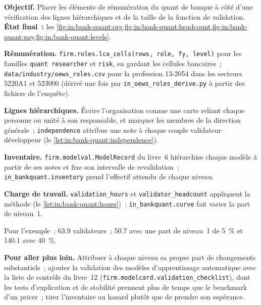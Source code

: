 \begin{tutorial}
\textbf{Objectif.} Placer les éléments de rémunération du quant de banque à côté d'une vérification des lignes hiérarchiques et de la taille de la
fonction de validation. \textbf{État final~:} les \cref{fig:in:bank-quant:org,fig:in:bank-quant:headcount,fig:in:bank-quant:pay,fig:in:bank-quant:levels}.
\begin{tutsteps}
\item \textbf{Rémunération.} \texttt{firm.roles.lca\_cells(rows, role, fy, level)} pour les familles \texttt{quant researcher} et
\texttt{risk}, en gardant les cellules bancaires~; \texttt{data/industry/oews\_roles.csv} pour la profession 13-2054 dans les secteurs
5220A1 et 523000 (dérivé une fois par \texttt{in\_oews\_roles\_derive.py} à partir des fichiers de l'enquête).
\item \textbf{Lignes hiérarchiques.} Écrire l'organisation comme une carte reliant chaque personne ou unité à son responsable, et marquer les
membres de la direction générale~; \texttt{independence} attribue une note à chaque couple validateur--développeur
(le \cref{lst:in:bank-quant:independence}).
\label{lst:in:bank-quant:independence}
\item \textbf{Inventaire.} \texttt{firm.modelval.ModelRecord} du livre~6 hiérarchise chaque modèle à partir de ses notes et fixe son
intervalle de revalidation~; \texttt{in\_bankquant.inventory} prend l'effectif attendu de chaque niveau.
\item \textbf{Charge de travail.} \texttt{validation\_hours} et \texttt{validator\_headcount} appliquent la méthode
(le \cref{lst:in:bank-quant:hours})~; \texttt{in\_bankquant.curve} fait varier la part de niveau~1.
\label{lst:in:bank-quant:hours}
\end{tutsteps}
\end{tutorial}

Pour l'exemple~: 63.9 validateurs~; 50.7 avec une part de niveau~1 de 5~\% et 140.1 avec 40~\%.

\textbf{Pour aller plus loin.} Attribuer à chaque niveau sa propre part de changements substantiels~; ajouter la validation des modèles d'apprentissage automatique avec
la liste de contrôle du livre~12 (\texttt{firm.modelcard.validation\_checklist}), dont les tests d'explication et de stabilité prennent plus de temps que le benchmark d'un pricer~;
tirer l'inventaire au hasard plutôt que de prendre son espérance.

